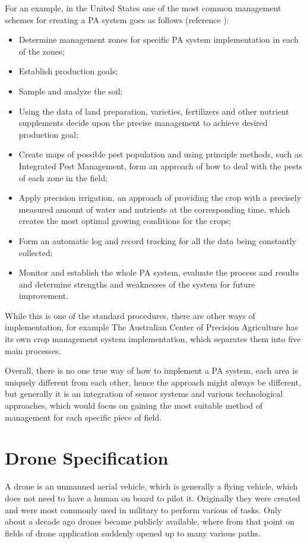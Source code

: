 \documentclass[11pt,a4paper,footinclude=true,headinclude=true, oneside]{scrbook}
\begin{document}
For an example, in the United States one of the most common management schemes for creating a PA system goes as follows (reference \cite{tran_concept_nodate}):
\begin{itemize}
    \item Determine management zones for specific PA system implementation in each of the zones;
    \item Establish production goals;
    \item Sample and analyze the soil;
    \item Using the data of land preparation, varieties, fertilizers and other nutrient supplements decide upon the precise management to achieve desired production goal;
    \item Create maps of possible pest population and using principle methods, such as Integrated Pest Management, form an approach of how to deal with the pests of each zone in the field;
    \item Apply precision irrigation, an approach of providing the crop with a precisely measured amount of water and nutrients at the corresponding time, which creates the most optimal growing conditions for the crops;
    \item Form an automatic log and record tracking for all the data being constantly collected;
    \item Monitor and establish the whole PA system, evaluate the process and results and determine strengths and weaknesses of the system for future improvement.
\end{itemize}

While this is one of the standard procedures, there are other ways of implementation, for example The Australian Center of Precision Agriculture has its own crop management system implementation, which separates them into five main processes. 

Overall, there is no one true way of how to implement a PA system, each area is uniquely different from each other, hence the approach might always be different, but generally it is an integration of sensor systems and various technological approaches, which would focus on gaining the most suitable method of management for each specific piece of field.

\chapter{Drone Specification}

A drone is an unmanned aerial vehicle, which is generally a flying vehicle, which does not need to have a human on board to pilot it. Originally they were created and were most commonly used in military to perform various of tasks. Only about a decade ago drones became publicly available, where from that point on fields of drone application suddenly opened up to many various paths.
\end{document}
